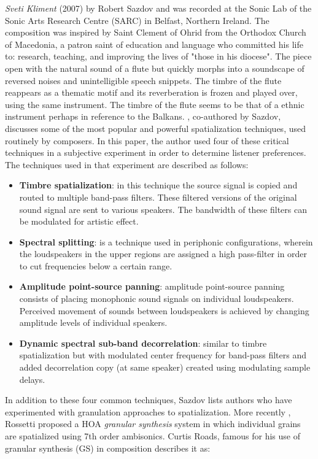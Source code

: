 \textit{Sveti Kliment} (2007) by Robert Sazdov and was recorded at the Sonic Lab of the Sonic Arts Research Centre (SARC) in Belfast, Northern Ireland. The composition was inspired by Saint Clement of Ohrid from the Orthodox Church of Macedonia, a patron saint of education and language who committed his life to: research, teaching, and improving the lives of "those in his diocese". The piece open with the natural sound of a flute but quickly morphs into a soundscape of reversed noises and unintelligible speech snippets. The timbre of the flute reappears as a thematic motif and its reverberation is frozen and played over, using the same instrument. The timbre of the flute seems to be that of a ethnic instrument perhaps in reference to the Balkans. 
\cite{lynch2017perceptual}, co-authored by Sazdov, discusses some of the most popular and powerful spatialization techniques, used routinely by composers. In this paper, the author used four of these critical techniques in a subjective experiment in order to determine listener preferences. The techniques used in that experiment are described as follows:

\begin{itemize}
    \item \textbf{Timbre spatialization}: in this technique the source signal is copied and routed to multiple band-pass filters. These filtered versions of the original sound signal are sent to various speakers. The bandwidth of these filters can be modulated for artistic effect. 
    \item \textbf{Spectral splitting}: is a technique used in periphonic configurations, wherein the loudspeakers in the upper regions are assigned a high pass-filter in order to cut frequencies below a certain range. 
    \item \textbf{Amplitude point-source panning}: amplitude point-source panning consists of placing monophonic sound signals on individual loudspeakers. Perceived movement of sounds between loudspeakers is achieved by changing amplitude levels of individual speakers.
    \item \textbf{Dynamic spectral sub-band decorrelation}: similar to timbre spatialization but with modulated center frequency for band-pass filters and added decorrelation copy (at same speaker) created using modulating sample delays. 
\end{itemize}

In addition to these four common techniques, Sazdov lists authors who have experimented with granulation approaches to spatialization. More recently \cite{rossetti2020studying}, Rossetti proposed a HOA \textit{granular synthesis} system in which individual grains are spatialized using 7th order ambisonics. Curtis Roads, famous for his use of granular synthesis (GS) in composition describes it as:

